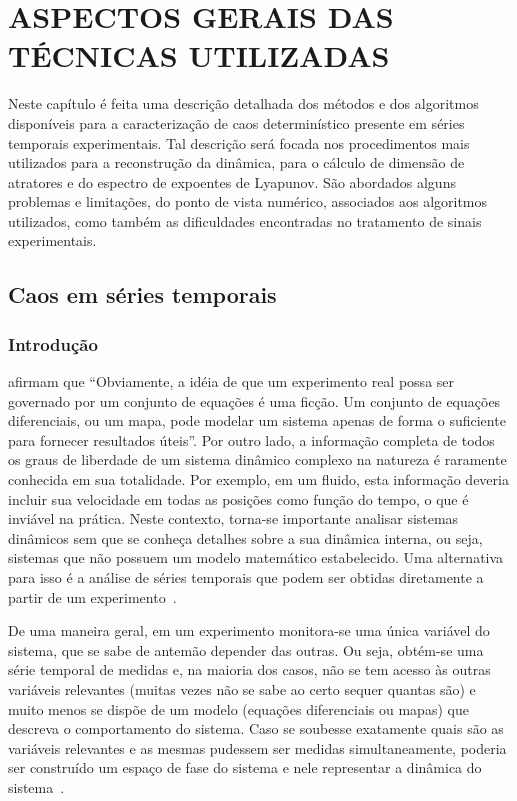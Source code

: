 
\chapter{ASPECTOS GERAIS DAS TÉCNICAS UTILIZADAS}
\label{caputiltecnicas}

Neste capítulo é feita uma descrição detalhada dos métodos e dos algoritmos disponíveis para a caracterização de caos determinístico presente em séries temporais experimentais. Tal descrição será focada nos procedimentos mais utilizados para a reconstrução da dinâmica, para o cálculo de dimensão de atratores e do espectro de expoentes de Lyapunov. São abordados alguns problemas e limitações, do ponto de vista numérico, associados aos algoritmos utilizados, como também as dificuldades encontradas no tratamento de sinais experimentais. 

\section{Caos em séries temporais}

\subsection{Introdução}

 afirmam que ``Obviamente, a idéia de que um experimento real possa ser governado por um conjunto de equações é uma ficção. Um conjunto de equações diferenciais, ou um mapa, pode modelar um sistema apenas de forma o suficiente para fornecer resultados úteis''. Por outro lado, a informação completa de todos os graus de liberdade de um sistema dinâmico complexo na natureza é raramente conhecida em sua totalidade. Por exemplo, em um fluido, esta informação deveria incluir sua velocidade em todas as posições como função do tempo, o que é inviável na prática. Neste contexto, torna-se importante analisar sistemas dinâmicos sem que se conheça detalhes sobre a sua dinâmica interna, ou seja, sistemas que não possuem um modelo matemático estabelecido. Uma alternativa para isso é a análise de séries temporais que podem ser obtidas diretamente a partir de um experimento~\cite{kantz/97}.

De uma maneira geral, em um experimento monitora-se uma única variável do sistema, que se sabe de antemão depender das outras. Ou seja, obtém-se uma série temporal de medidas e, na maioria dos casos, não se tem acesso às outras variáveis relevantes (muitas vezes não se sabe ao certo sequer quantas são) e muito menos se dispõe de um modelo (equações diferenciais ou mapas) que descreva o comportamento do sistema. Caso se soubesse exatamente quais são as variáveis relevantes e as mesmas pudessem ser medidas simultaneamente, poderia ser construído um espaço de fase do sistema e nele representar a dinâmica do sistema~\cite{aguirre/00}.

